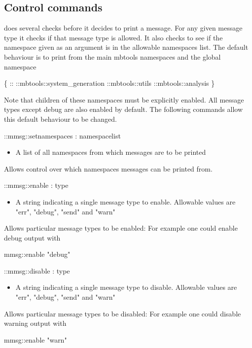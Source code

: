 \subsection{Control commands}

 does several checks before it decides to print a
message. For any given message type it checks if that message type is
allowed. It also checks to see if the namespace given as an argument
is in the allowable namespaces list. The default behaviour is to print
from the main mbtools namespaces and the global namespace

\begin{code}
  \{ :: ::mbtools::system_generation ::mbtools::utils ::mbtools::analysis \}
\end{code}
  
Note that children of these namespaces must be explicitly enabled. All
message types except debug are also enabled by default. The following
commands allow this default behaviour to be changed.

\begin{code} 
  ::mmsg::setnamespaces : namespacelist
\end{code}
\begin{itemize}
\item {} A list of all namespaces from which messages
  are to be printed
\end{itemize}
Allows control over which namespaces messages can be printed from.
\begin{code}     
  ::mmsg::enable : type
\end{code}
\begin{itemize}
\item {} A string indicating a single message type to
  enable. Allowable values are "err", "debug", "send" and "warn"
\end{itemize}
Allows particular message types to be enabled: For example one could
enable debug output with
\begin{code}
       mmsg::enable "debug" 
\end{code}

\begin{code}     
  ::mmsg::disable : type
\end{code}
\begin{itemize}
\item {} A string indicating a single message type to
  disable. Allowable values are "err", "debug", "send" and "warn"
\end{itemize}
Allows particular message types to be disabled: For example one could
disable warning output with
\begin{code}
       mmsg::enable "warn" 
\end{code}

